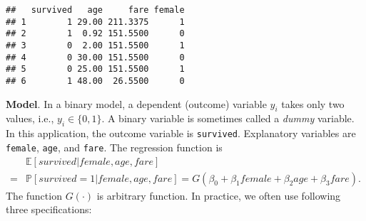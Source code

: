 \documentclass[
  12pt,
]{article}
\newenvironment{Shaded}{\begin{snugshade}}{\end{snugshade}}
\newcommand{\DataTypeTok}[1]{\textcolor[rgb]{0.13,0.29,0.53}{#1}}
\newcommand{\DecValTok}[1]{\textcolor[rgb]{0.00,0.00,0.81}{#1}}
\newcommand{\KeywordTok}[1]{\textcolor[rgb]{0.13,0.29,0.53}{\textbf{#1}}}
\newcommand{\NormalTok}[1]{#1}
\newcommand{\OperatorTok}[1]{\textcolor[rgb]{0.81,0.36,0.00}{\textbf{#1}}}
\newcommand{\OtherTok}[1]{\textcolor[rgb]{0.56,0.35,0.01}{#1}}
\newcommand{\StringTok}[1]{\textcolor[rgb]{0.31,0.60,0.02}{#1}}
\begin{document}
\begin{Shaded}
\end{Shaded}

\begin{verbatim}
##   survived   age     fare female
## 1        1 29.00 211.3375      1
## 2        1  0.92 151.5500      0
## 3        0  2.00 151.5500      1
## 4        0 30.00 151.5500      0
## 5        0 25.00 151.5500      1
## 6        1 48.00  26.5500      0
\end{verbatim}

\noindent \textbf{Model}. In a binary model, a dependent (outcome)
variable \(y_i\) takes only two values, i.e., \(y_i \in \{0, 1\}\). A
binary variable is sometimes called a \emph{dummy} variable. In this
application, the outcome variable is \texttt{survived}. Explanatory
variables are \texttt{female}, \texttt{age}, and \texttt{fare}. The
regression function is \begin{equation*}
  \begin{split}
    &\mathbb{E}[survived | female, age, fare] \\
    =& \mathbb{P}[survived = 1 | female, age, fare]
    = G(\beta_0 + \beta_1 female + \beta_2 age + \beta_3 fare).
  \end{split}
\end{equation*} The function \(G(\cdot)\) is arbitrary function. In
practice, we often use following three specifications:
\end{document}
